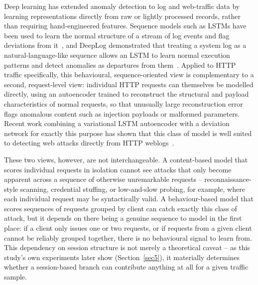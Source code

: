 \documentclass[futureinternet,article,accept,moreauthors]{Definitions/mdpi}
\begin{document}
Deep learning has extended anomaly detection to log and web-traffic data by learning representations directly from raw or lightly processed records, rather than requiring hand-engineered features. Sequence models such as LSTMs have been used to learn the normal structure of a stream of log events and flag deviations from it~\cite{nedelkoski2020}, and DeepLog demonstrated that treating a system log as a natural-language-like sequence allows an LSTM to learn normal execution patterns and detect anomalies as departures from them~\cite{du2017}. Applied to HTTP traffic specifically, this behavioural, sequence-oriented view is complementary to a second, request-level view: individual HTTP requests can themselves be modelled directly, using an autoencoder trained to reconstruct the structural and payload characteristics of normal requests, so that unusually large reconstruction error flags anomalous content such as injection payloads or malformed parameters. Recent work combining a variational LSTM autoencoder with a deviation network for exactly this purpose has shown that this class of model is well suited to detecting web attacks directly from HTTP weblogs~\cite{jagat2024}.

These two views, however, are not interchangeable. A content-based model that scores individual requests in isolation cannot see attacks that only become apparent across a sequence of otherwise unremarkable requests -- reconnaissance-style scanning, credential stuffing, or low-and-slow probing, for example, where each individual request may be syntactically valid. A behaviour-based model that scores sequences of requests grouped by client can catch exactly this class of attack, but it depends on there being a genuine sequence to model in the first place: if a client only issues one or two requests, or if requests from a given client cannot be reliably grouped together, there is no behavioural signal to learn from. This dependency on session structure is not merely a theoretical caveat -- as this study's own experiments later show (Section~\ref{sec5}), it materially determines whether a session-based branch can contribute anything at all for a given traffic sample.
\end{document}
